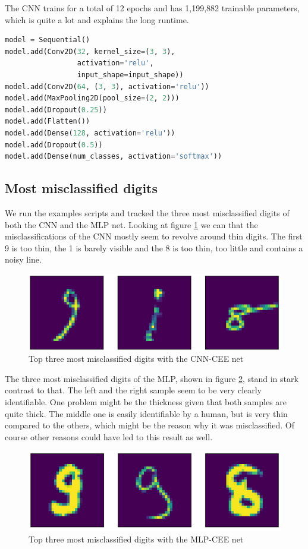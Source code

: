 \documentclass{article}[]
\begin{document}
The CNN trains for a total of 12 epochs and has 1,199,882 trainable parameters, which is quite a lot and explains the long runtime.

\begin{lstlisting}[language=Python, label=mnist-cnn, caption={mnist\_mlp.py model}, captionpos=b]
model = Sequential()
model.add(Conv2D(32, kernel_size=(3, 3),
                 activation='relu',
                 input_shape=input_shape))
model.add(Conv2D(64, (3, 3), activation='relu'))
model.add(MaxPooling2D(pool_size=(2, 2)))
model.add(Dropout(0.25))
model.add(Flatten())
model.add(Dense(128, activation='relu'))
model.add(Dropout(0.5))
model.add(Dense(num_classes, activation='softmax'))
\end{lstlisting}



\subsection{Most misclassified digits}
\label{most-misclassified-digits}
We run the examples scripts and tracked the three most misclassified digits of both the CNN and the MLP net.
Looking at figure \ref{fig:cnn} we can that the misclassifications of the CNN mostly seem to revolve around thin digits.
The first 9 is too thin, the 1 is barely visible and the 8 is too thin, too little and contains a noisy line.

\begin{figure}[H]
	\centering
	\includegraphics[width=0.5\linewidth]{img/cnn_categorial_cross_non_perm.png}
	\caption{Top three most misclassified digits with the CNN-CEE net}
	\label{fig:cnn}
\end{figure}

The three most misclassified digits of the MLP, shown in figure \ref{fig:mlp}, stand in stark contrast to that.
The left and the right sample seem to be very clearly identifiable.
One problem might be the thickness given that both samples are quite thick.
The middle one is easily identifiable by a human, but is very thin compared to the others, which might be the reason why it was misclassified.
Of course other reasons could have led to this result as well.

\begin{figure}[H]
	\centering
	\includegraphics[width=0.5\linewidth]{img/mpl_categorial_cross_non_perm.png}
	\caption{Top three most misclassified digits with the MLP-CEE net}
	\label{fig:mlp}
\end{figure}
\end{document}
